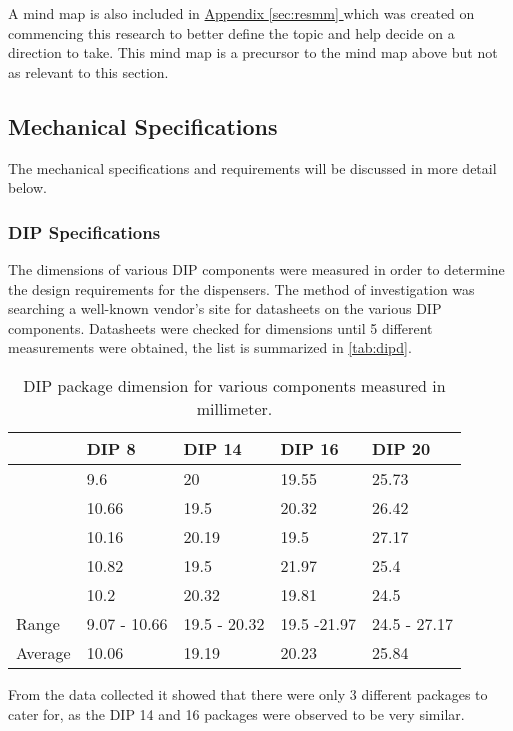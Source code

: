 \documentclass[a4paper,11pt]{article}
\newcommand*{\fullref}[1]{\hyperref[{#1}]{\Appendixautorefname  \ref*{#1} \nameref*{#1}}}
\newcommand*{\Appendixautorefname}{Appendix }
\numberwithin{figure}{section}
\numberwithin{table}{section}
\begin{document}
A mind map is also included in \fullref{sec:resmm} which was created on commencing this research to better define the topic and help decide on a direction to take. This mind map is a precursor to the mind map above but not as relevant to this section.

\subsection{Mechanical Specifications}
The mechanical specifications and requirements will be discussed in more detail below.
\subsubsection{DIP Specifications}
The dimensions of various DIP components were measured in order to determine the design requirements for the dispensers. The method of investigation was searching a well-known vendor's site\cite{mantech}  for datasheets on the various DIP components. Datasheets were checked for dimensions until 5 different measurements were obtained, the list is summarized in \autoref{tab:dipd}.
\newpage

	\begin{table}[ht]
	\centering		
	\begin{tabular}{| m{2cm} | m{2cm} | m{2cm}| m{2cm} | m{2cm} |}
	\hline
	& DIP 8 & DIP 14 & DIP 16 & DIP 20 \\
	\hline
	& 9.6 & 20 & 19.55 & 25.73\\
	\hline
	& 10.66 & 19.5 & 20.32 & 26.42\\
	\hline
	& 10.16 & 20.19 &19.5 & 27.17\\
	\hline
	& 10.82  & 19.5 & 21.97 & 25.4\\
	\hline
	& 10.2 & 20.32 & 19.81 & 24.5\\
	\hline
	Range & 9.07 - 10.66 & 19.5 - 20.32 & 19.5 -21.97 & 24.5 - 27.17 \\
	\hline
	Average & 10.06 & 19.19 & 20.23 & 25.84 \\
	\hline
	\end{tabular}
	\caption{DIP package dimension for various components measured in millimeter. \label{tab:dipd}}
	\end{table}

From the data collected it showed that there were only 3 different packages to cater for, as the DIP 14 and 16 packages were observed to be very similar.
\end{document}
